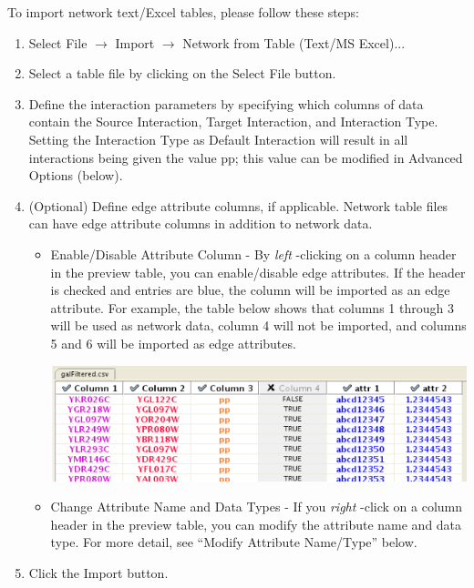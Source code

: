  To import network text/Excel tables, please follow these steps: 
\begin{enumerate}
\item Select File $\rightarrow$ Import $\rightarrow$ Network from Table (Text/MS Excel)... 
\item Select a table file by clicking on the Select File button. 
\item Define the interaction parameters by specifying which columns of data contain the Source Interaction, Target Interaction, and Interaction Type. Setting the Interaction Type as Default Interaction will result in all interactions being given the value pp; this value can be modified in Advanced Options (below). 
\item (Optional) Define edge attribute columns, if applicable. Network table files can have edge attribute columns in addition to network data.
\begin{itemize}
\item Enable/Disable Attribute Column - By \emph{left}
-clicking on a column header in the preview table, you can enable/disable edge attributes. If the header is checked and entries are blue, the column will be imported as an edge attribute. For example, the table below shows that columns 1 through 3 will be used as network data, column 4 will not be imported, and columns 5 and 6 will be imported as edge attributes. 
\begin{center}
\includegraphics[wdith=\textwidth]{images/network_table_sample.png} 
\end{center}

\item 

 Change Attribute Name and Data Types - If you \emph{right}
-click on a column header in the preview table, you can modify the attribute name and data type. For more detail, see ``Modify Attribute Name/Type'' below. 

\end{itemize}
\item Click the Import button. 
\end{enumerate}

